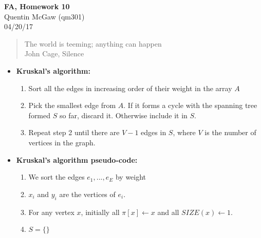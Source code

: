 \documentclass[11pt]{article}
\begin{document}
\begin{center} {\Large\bf FA, Homework 10} \\ Quentin McGaw (qm301) \\ 04/20/17
\end{center}

\begin{quote}
The world is teeming; anything can happen
\\ John Cage, Silence
\end{quote}

\begin{itemize}
    \item \textbf{Kruskal's algorithm:}
    \begin{enumerate}
        \item Sort all the edges in increasing order of their weight in the array $A$
        \item Pick the smallest edge from $A$. If it forms a cycle with the spanning tree formed $S$ so far, discard it. Otherwise include it in $S$.
        \item Repeat step 2 until there are $V-1$ edges in $S$, where $V$ is the number of vertices in the graph.
    \end{enumerate}
    \item \textbf{Kruskal's algorithm pseudo-code:}
    \begin{enumerate}
        \item We sort the edges $e_1, ..., e_E$ by weight
        \item $x_i$ and $y_i$ are the vertices of $e_i$.
        \item For any vertex $x$, initially all $\pi[x] \leftarrow x$ and all $SIZE(x) \leftarrow 1$.
        \item 
        \begin{algorithm}[H]
            $S = \{\}$ \\
        \end{algorithm}
        
    \end{enumerate}
    
\end{itemize}
\end{document}
